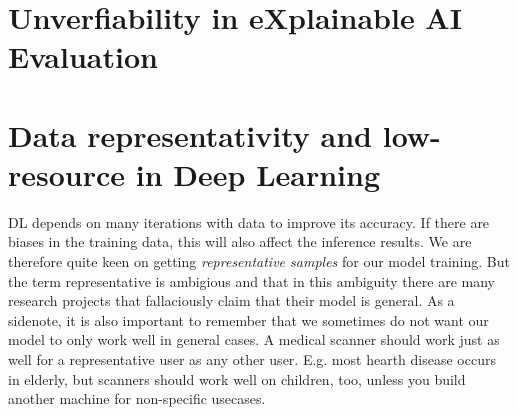 \documentclass[10pt,twocolumn,letterpaper]{article}
\begin{document}
\section{Unverfiability in eXplainable AI Evaluation}

\section{Data representativity and low-resource in Deep Learning}

\gls{DL} depends on many iterations with data to improve its accuracy. If there are biases in the training data, this will also affect the inference results. We are therefore quite keen on getting \textit{representative samples} for our model training. But the term representative is ambigious and that in this ambiguity there are many research projects that fallaciously claim that their model is general. As a sidenote, it is also important to remember that we sometimes do not want our model to only work well in general cases. A medical scanner should work just as well for a representative user as any other user. E.g. most hearth disease occurs in elderly, but scanners should work well on children, too, unless you build another machine for non-specific usecases.
\end{document}
